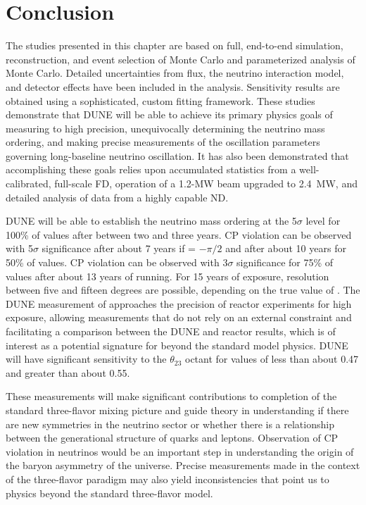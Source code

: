 \section{Conclusion}
\label{sec:physics-lbnosc-conclude}

The studies presented in this chapter are based on full, end-to-end simulation, reconstruction, and event selection of  Monte Carlo and parameterized analysis of  Monte Carlo. Detailed uncertainties from flux, the neutrino interaction model, and detector effects have been included in the analysis. Sensitivity results are obtained using a sophisticated, custom fitting framework. These studies demonstrate that DUNE will be able to achieve its primary physics goals of measuring \deltacp to high precision, unequivocally determining the neutrino mass ordering, and making precise measurements of the oscillation parameters governing long-baseline neutrino oscillation. It has also been demonstrated that accomplishing these goals relies upon accumulated statistics from a well-calibrated, full-scale FD,  operation of a 1.2-MW beam upgraded to 2.4~MW, and detailed analysis of data from a highly capable ND.

DUNE will be able to establish the neutrino mass ordering at the 5$\sigma$ level for 100\% of \deltacp values after between two and three years. CP violation can be observed with 5$\sigma$ significance after about 7 years if \deltacp = $-\pi/2$ and after about 10 years for 50\% of \deltacp values. CP violation can be observed with 3$\sigma$ significance for 75\% of \deltacp values after about 13 years of running. For 15 years of exposure, \deltacp resolution between five and fifteen degrees are possible, depending on the true value of \deltacp. The DUNE measurement of  approaches the precision of reactor experiments for high exposure, allowing measurements that do not rely on an external  constraint and facilitating a comparison between the DUNE and reactor   results, which is of interest as a potential signature for beyond the standard model physics. DUNE will have significant sensitivity to the $\theta_{23}$ octant for values of  less than about 0.47 and greater than about 0.55.

These measurements will make significant contributions to completion of the standard three-flavor 
mixing picture and guide theory in understanding if there are new symmetries in the neutrino sector or whether there is a relationship between the generational structure of quarks and leptons. Observation of CP violation in neutrinos would be an important step in understanding the origin of the baryon asymmetry of the universe. Precise measurements made in the context of the three-flavor paradigm may also yield inconsistencies that point us to physics beyond the standard three-flavor model. 
